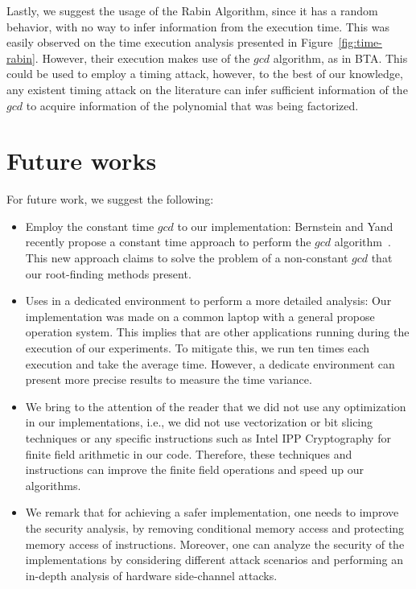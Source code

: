 Lastly, we suggest the usage of the Rabin Algorithm, since it has a random behavior, with no way to infer information from the execution time. This was easily observed on the time execution analysis presented in Figure~\ref{fig:time-rabin}. However, their execution makes use of the $gcd$ algorithm, as in BTA. This could be used to employ a timing attack, however, to the best of our knowledge, any existent timing attack on the literature can infer sufficient information of the $gcd$ to acquire information of the polynomial that was being factorized.

\section{Future works}
For future work, we suggest the following:

\begin{itemize}
    \item Employ the constant time $gcd$ to our implementation: Bernstein and Yand recently propose a constant time approach to perform the $gcd$ algorithm~\cite{Bernstein_Yang_2019}. This new approach claims to solve the problem of a non-constant $gcd$ that our root-finding methods present. 
    \item Uses in a dedicated environment to perform a more detailed analysis: Our implementation was made on a common laptop with a general propose operation system. This implies that are other applications running during the execution of our experiments. To mitigate this, we run ten times each execution and take the average time. However, a dedicate environment can present more precise results to measure the time variance. 
    \item We bring to the attention of the reader that we did not use any optimization in our implementations, i.e., we did not use vectorization or bit slicing techniques or any specific instructions such as Intel\textsuperscript{\tiny\textregistered} IPP Cryptography for finite field arithmetic in our code. Therefore, these techniques and instructions can improve the finite field operations and speed up our algorithms.
    \item We remark that for achieving a safer implementation, one needs to improve the security analysis, by removing conditional memory access and protecting memory access of instructions. Moreover, one can analyze the security of the implementations by considering different attack scenarios and performing an in-depth analysis of hardware side-channel attacks. 
\end{itemize}